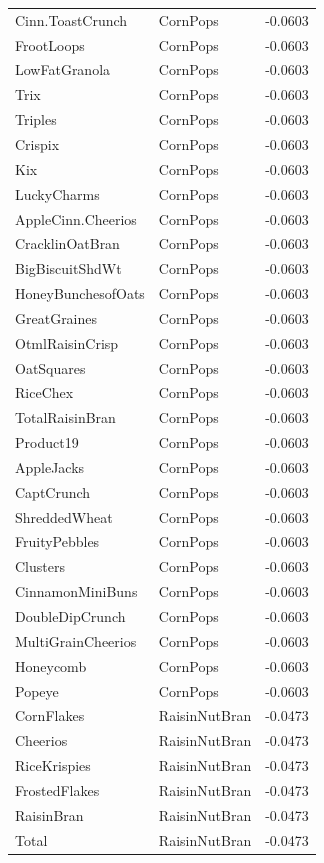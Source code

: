 \begin{longtable}{llr}
Cinn.ToastCrunch & CornPops & -0.0603 \\
FrootLoops & CornPops & -0.0603 \\
LowFatGranola & CornPops & -0.0603 \\
Trix & CornPops & -0.0603 \\
Triples & CornPops & -0.0603 \\
Crispix & CornPops & -0.0603 \\
Kix & CornPops & -0.0603 \\
LuckyCharms & CornPops & -0.0603 \\
AppleCinn.Cheerios & CornPops & -0.0603 \\
CracklinOatBran & CornPops & -0.0603 \\
BigBiscuitShdWt & CornPops & -0.0603 \\
HoneyBunchesofOats & CornPops & -0.0603 \\
GreatGraines & CornPops & -0.0603 \\
OtmlRaisinCrisp & CornPops & -0.0603 \\
OatSquares & CornPops & -0.0603 \\
RiceChex & CornPops & -0.0603 \\
TotalRaisinBran & CornPops & -0.0603 \\
Product19 & CornPops & -0.0603 \\
AppleJacks & CornPops & -0.0603 \\
CaptCrunch & CornPops & -0.0603 \\
ShreddedWheat & CornPops & -0.0603 \\
FruityPebbles & CornPops & -0.0603 \\
Clusters & CornPops & -0.0603 \\
CinnamonMiniBuns & CornPops & -0.0603 \\
DoubleDipCrunch & CornPops & -0.0603 \\
MultiGrainCheerios & CornPops & -0.0603 \\
Honeycomb & CornPops & -0.0603 \\
Popeye & CornPops & -0.0603 \\
CornFlakes & RaisinNutBran & -0.0473 \\
Cheerios & RaisinNutBran & -0.0473 \\
RiceKrispies & RaisinNutBran & -0.0473 \\
FrostedFlakes & RaisinNutBran & -0.0473 \\
RaisinBran & RaisinNutBran & -0.0473 \\
Total & RaisinNutBran & -0.0473 \\

\end{longtable}
